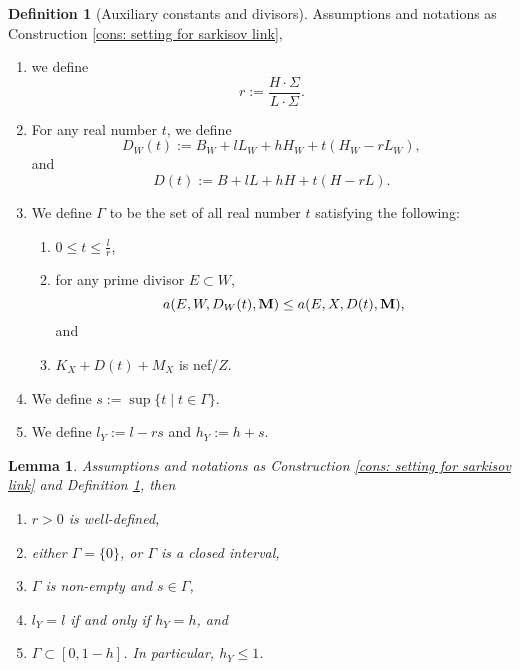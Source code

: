 \documentclass[11pt]{amsart}
\numberwithin{equation}{section}
\newcommand{\Mm}{{\bf{M}}}
\newcommand{\Ii}{\Gamma}
\newtheorem{lem}[thm]{Lemma}
\theoremstyle{definition}
\newtheorem{defn}[thm]{Definition}
\theoremstyle{definition}
\theoremstyle{definition}
\begin{document}
\begin{defn}[Auxiliary constants and divisors]\label{defn: auxiliary invariants}
Assumptions and notations as Construction \ref{cons: setting for sarkisov link},
\begin{enumerate}
    \item we define $$r:=\frac{H\cdot\Sigma}{L\cdot\Sigma}.$$
    \item For any real number $t$, we define
    $$D_W(t):=B_W+lL_W+hH_W+t(H_W-rL_W),$$ 
and 
$$D(t):=B+lL+hH+t(H-rL).$$

\item We define $\Gamma$ to be the set of all real number $t$ satisfying the following:
\begin{enumerate}
    \item $0\leq t\leq\frac{l}{r}$,
        \item for any prime divisor $E\subset W$,
    $$a(E,W,D_W(t),\Mm)\leq a(E,X,D(t),\Mm),$$
    and
    \item $K_X+D(t)+M_X$ is nef$/Z$.
\end{enumerate}
\item We define $s:=\sup\{t\mid t\in\Gamma\}$.
\item We define $l_Y:=l-rs$ and $h_Y:=h+s$.
\end{enumerate}
\end{defn}


\begin{lem}\label{lem: sarkisov h<=1}
Assumptions and notations as Construction \ref{cons: setting for sarkisov link} and Definition \ref{defn: auxiliary invariants}, then 
\begin{enumerate}
\item $r>0$ is well-defined,
    \item either $\Ii=\{0\}$, or $\Ii$ is a closed interval,
    \item $\Ii$ is non-empty and $s\in\Ii$, 
    \item $l_Y=l$ if and only if $h_Y=h$, and
    \item $\Ii\subset [0,1-h]$. In particular, $h_Y\leq 1$.
\end{enumerate}
\end{lem}
\end{document}
